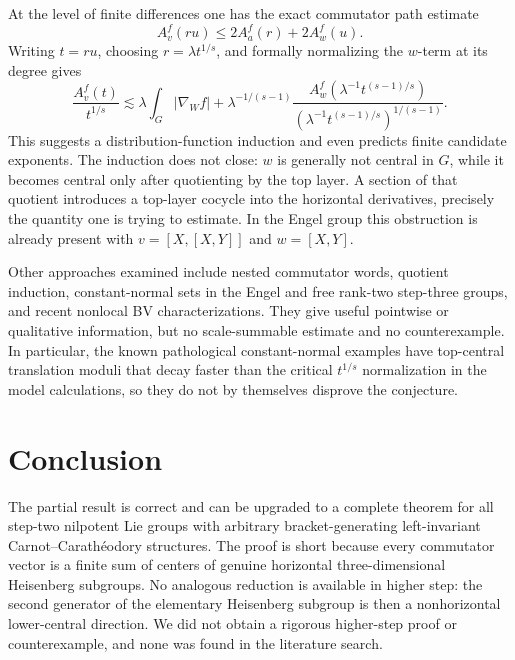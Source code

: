 \documentclass[11pt]{article}
\theoremstyle{remark}
\newcommand{\abs}[1]{\lvert #1\rvert}
\begin{document}
At the level of finite differences one has the exact commutator path estimate
\begin{equation}\label{eq:heuristic}
 A_v^f(ru)\le2A_a^f(r)+2A_w^f(u).
\end{equation}
Writing \(t=ru\), choosing \(r=\lambda t^{1/s}\), and formally normalizing the
\(w\)-term at its degree gives
\[
 \frac{A_v^f(t)}{t^{1/s}}
 \lesssim \lambda\int_G\abs{\nabla_Wf}
 +\lambda^{-1/(s-1)}
 \frac{A_w^f(\lambda^{-1}t^{(s-1)/s})}
 {(\lambda^{-1}t^{(s-1)/s})^{1/(s-1)}}.
\]
This suggests a distribution-function induction and even predicts finite candidate
exponents.  The induction does not close: \(w\) is generally not central in \(G\), while
it becomes central only after quotienting by the top layer.  A section of that quotient
introduces a top-layer cocycle into the horizontal derivatives, precisely the quantity one
is trying to estimate.  In the Engel group this obstruction is already present with
\(v=[X,[X,Y]]\) and \(w=[X,Y]\).

Other approaches examined include nested commutator words, quotient induction,
constant-normal sets in the Engel and free rank-two step-three groups, and recent
nonlocal BV characterizations.  They give useful pointwise or qualitative information,
but no scale-summable estimate and no counterexample.  In particular, the known
pathological constant-normal examples have top-central translation moduli that decay
faster than the critical \(t^{1/s}\) normalization in the model calculations, so they do not
by themselves disprove the conjecture.

\section{Conclusion}
The partial result is correct and can be upgraded to a complete theorem for all
step-two nilpotent Lie groups with arbitrary bracket-generating left-invariant
Carnot--Carath\'eodory structures.  The proof is short because every commutator vector is
a finite sum of centers of genuine horizontal three-dimensional Heisenberg subgroups.
No analogous reduction is available in higher step: the second generator of the elementary
Heisenberg subgroup is then a nonhorizontal lower-central direction.  We did not obtain a
rigorous higher-step proof or counterexample, and none was found in the literature search.
\end{document}
